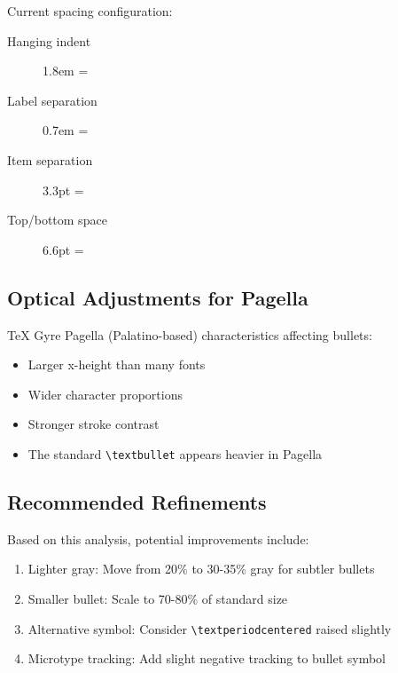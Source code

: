 \documentclass[11pt,letterpaper]{article}
\begin{document}
Current spacing configuration:
\begin{description}
\item[Hanging indent] 1.8em = \the\listhangindent
\item[Label separation] 0.7em = \the\listlabelsep  
\item[Item separation] 3.3pt = \the\listquarterquantum
\item[Top/bottom space] 6.6pt = \the\listhalfquantum
\end{description}

\subsection{Optical Adjustments for Pagella}

TeX Gyre Pagella (Palatino-based) characteristics affecting bullets:
\begin{itemize}
\item Larger x-height than many fonts
\item Wider character proportions
\item Stronger stroke contrast
\item The standard \texttt{\textbackslash textbullet} appears heavier in Pagella
\end{itemize}

\subsection{Recommended Refinements}

Based on this analysis, potential improvements include:
\begin{enumerate}
\item Lighter gray: Move from 20\% to 30-35\% gray for subtler bullets
\item Smaller bullet: Scale to 70-80\% of standard size
\item Alternative symbol: Consider \texttt{\textbackslash textperiodcentered} raised slightly
\item Microtype tracking: Add slight negative tracking to bullet symbol
\end{enumerate}
\end{document}
